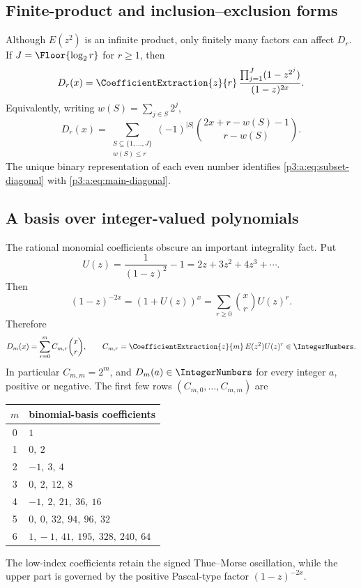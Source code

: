 \documentclass[11pt,oneside]{article}
\numberwithin{equation}{section}
\theoremstyle{definition}
\theoremstyle{remark}
\begin{document}
\subsection{Finite-product and inclusion--exclusion forms}

Although \(E(z^2)\) is an infinite product, only finitely many factors can
affect \(D_r\).  If \(J=\Floor{\log_2r}\) for \(r\ge1\), then
\begin{equation}
 D_r(x)=
 \CoefficientExtraction{z}{r}\,{
 \frac{\prod_{j=1}^{J}(1-z^{2^j})}{(1-z)^{2x}}}.
 \label{p3:a:eq:finite-product-diagonal}
\end{equation}
Equivalently, writing \(w(S)=\sum_{j\in S}2^j\),
\begin{equation}
 D_r(x)=
 \sum_{\substack{S\subseteq\{1,\ldots,J\}\\w(S)\le r}}
 (-1)^{|S|}
 \binom{2x+r-w(S)-1}{r-w(S)}.
 \label{p3:a:eq:subset-diagonal}
\end{equation}
The unique binary representation of each even number identifies
\eqref{p3:a:eq:subset-diagonal} with \eqref{p3:a:eq:main-diagonal}.
\subsection{A basis over integer-valued polynomials}

The rational monomial coefficients obscure an important integrality fact.
Put
\[
 U(z)=\frac{1}{(1-z)^2}-1=2z+3z^2+4z^3+\cdots.
\]
Then
\[
 (1-z)^{-2x}=(1+U(z))^x
 =\sum_{r\ge0}\binom xrU(z)^r.
\]
Therefore
\begin{equation}
 D_m(x)=\sum_{r=0}^{m}C_{m,r}\binom xr,
 \qquad
 C_{m,r}=\CoefficientExtraction{z}{m}\,{E(z^2)U(z)^r}\in\IntegerNumbers.
 \label{p3:b:eq:binomial-basis}
\end{equation}
In particular $C_{m,m}=2^m$, and $D_m(a)\in\IntegerNumbers$ for every integer
$a$, positive or negative.  The first few rows $(C_{m,0},\ldots,C_{m,m})$
are
\begin{center}
\small
\begin{tabular}{c@{\qquad}l}
\toprule
$m$ & binomial-basis coefficients \\
\midrule
0 & $1$\\
1 & $0,\ 2$\\
2 & $-1,\ 3,\ 4$\\
3 & $0,\ 2,\ 12,\ 8$\\
4 & $-1,\ 2,\ 21,\ 36,\ 16$\\
5 & $0,\ 0,\ 32,\ 94,\ 96,\ 32$\\
6 & $1,\!-1,\ 41,\ 195,\ 328,\ 240,\ 64$\\
\bottomrule
\end{tabular}
\end{center}
The low-index coefficients retain the signed Thue--Morse oscillation, while
the upper part is governed by the positive Pascal-type factor
$(1-z)^{-2x}$.
\end{document}
